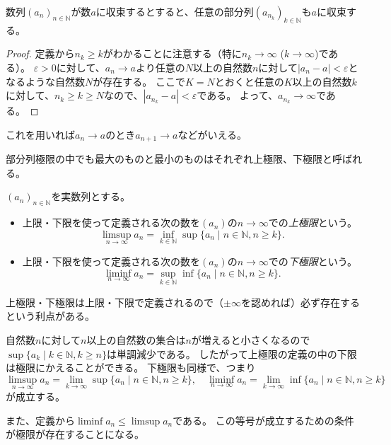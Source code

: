 \begin{proposition}
数列$(a_n)_{n \in \mathbb{N}}$が数$a$に収束するとすると、任意の部分列$(a_{n_k})_{k \in \mathbb{N}}$も$a$に収束する。
\end{proposition}

\begin{proof}
定義から$n_k \ge k$がわかることに注意する（特に$n_k \to \infty$ ($k \to \infty$)である）。
$\varepsilon > 0$に対して、$a_n \to a$より任意の$N$以上の自然数$n$に対して$|a_n-a| < \varepsilon$となるような自然数$N$が存在する。
ここで$K = N$とおくと任意の$K$以上の自然数$k$に対して、$n_k \ge k \ge N$なので、$|a_{n_k}-a| < \varepsilon$である。
よって、$a_{n_k} \to \infty$である。
\end{proof}

これを用いれば$a_n \to a$のとき$a_{n+1} \to a$などがいえる。

部分列極限の中でも最大のものと最小のものはそれぞれ上極限、下極限と呼ばれる。

\begin{definition}
$(a_n)_{n \in \mathbb{N}}$を実数列とする。
\begin{itemize}
\item
上限・下限を使って定義される次の数を$(a_n)$の$n \to \infty$での\emph{上極限}という。
$$
\limsup_{n \to \infty}a_n = \inf_{k \in \mathbb{N}}\sup\{ a_n \mid n \in \mathbb{N}, n \ge k \}.
$$
\item
上限・下限を使って定義される次の数を$(a_n)$の$n \to \infty$での\emph{下極限}という。
$$
\liminf_{n \to \infty}a_n = \sup_{k \in \mathbb{N}}\inf\{ a_n \mid n \in \mathbb{N}, n \ge k \}.
$$
\end{itemize}
\end{definition}

上極限・下極限は上限・下限で定義されるので（$\pm \infty$を認めれば）必ず存在するという利点がある。

\begin{remark}
自然数$n$に対して$n$以上の自然数の集合は$n$が増えると小さくなるので$\sup\{ a_k \mid k \in \mathbb{N}, k \ge n \}$は単調減少である。
したがって上極限の定義の中の下限は極限にかえることができる。
下極限も同様で、つまり
$$
\limsup_{n \to \infty}a_n = \lim_{k \to \infty}\sup\{ a_n \mid n \in \mathbb{N}, n \ge k \},
\quad \liminf_{n \to \infty}a_n = \lim_{k \to \infty}\inf\{ a_n \mid n \in \mathbb{N}, n \ge k \}
$$
が成立する。
\end{remark}

また、定義から$\liminf a_n \le \limsup a_n$である。
この等号が成立するための条件が極限が存在することになる。

